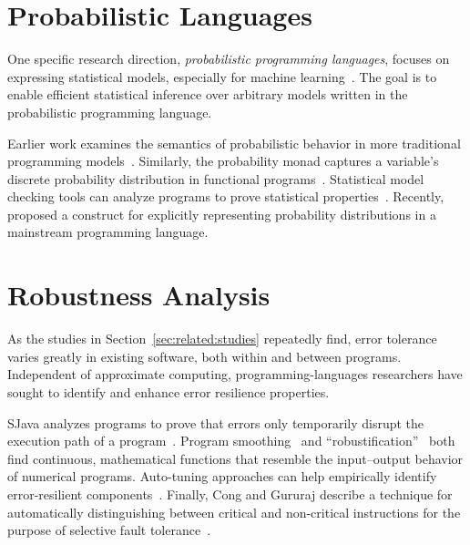 \section{Probabilistic Languages}

One specific research direction, \emph{probabilistic programming languages},
focuses on expressing statistical models, especially for machine
learning~\cite{BBGR13, wingate-lightweight, church, chaganty, pfeffersample,
probdsl, koller, sriram-pldi}.
The goal is to enable efficient statistical inference over arbitrary models
written in the probabilistic programming language.

Earlier work examines the semantics of probabilistic behavior in more
traditional programming models~\cite{kozen}.
Similarly, the probability monad captures a variable's discrete probability
distribution in functional programs~\cite{pmonad}.
Statistical model checking tools can analyze programs to prove statistical
properties~\cite{legay10, KNP11}.
Recently, \citet{uncertaint} proposed a construct for explicitly representing
probability distributions in a mainstream programming language.


\section{Robustness Analysis}

As the studies in Section~\ref{sec:related:studies} repeatedly find, error
tolerance varies greatly in existing software, both within and between
programs.
Independent of approximate computing, programming-languages researchers have
sought to identify and enhance error resilience properties.

SJava analyzes programs to prove that
errors only temporarily disrupt the execution path of a program~\cite{sjava}.
Program smoothing~\cite{smoothing-cav, smoothing-pldi, smoothing-fse} and
``robustification''~\cite{robustification} both find continuous, mathematical
functions that resemble the input--output behavior of numerical programs.
Auto-tuning approaches can help empirically identify error-resilient
components~\cite{asac}.
Finally, Cong and Gururaj describe a technique for automatically
distinguishing between critical and non-critical instructions for the purpose
of selective fault tolerance~\cite{cong-iccad}.
